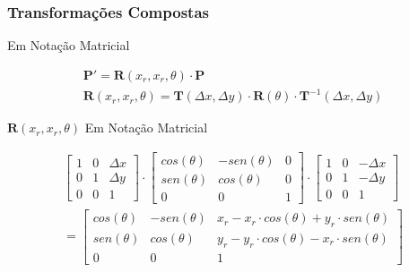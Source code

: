 \documentclass{beamer}
\begin{document}
\begin{frame}
\frametitle{Transformações Compostas}
	
	\begin{block}{Em Notação Matricial }
		
		\begin{eqnarray*}
			\textbf{P}' = \textbf{R}(x_r,x_r,\theta) \cdot \textbf{P} \\
			\textbf{R}(x_r,x_r,\theta) = \textbf{T}(\Delta x,\Delta y) \cdot \textbf{R}(\theta) \cdot \textbf{T}^{-1}( \Delta x,\Delta y)
			\end{eqnarray*}
	\end{block}	
	
	\begin{block}{$\textbf{R}(x_r,x_r,\theta)$ Em Notação Matricial }
		
		\begin{eqnarray*}
			\begin{bmatrix}
					1	& 0 	& \Delta x \\
					0 	& 1	& \Delta y \\
					0	& 0	& 1
			\end{bmatrix}
			\cdot \begin{bmatrix}
					cos(\theta)	& -sen (\theta) 	& 0 \\
					sen(\theta) 	& cos(\theta)		& 0 \\
					0	& 0	& 1
			\end{bmatrix}
			\cdot \begin{bmatrix}
					1	& 0 	& -\Delta x \\
					0 	& 1	& -\Delta y \\
					0	& 0	& 1
			\end{bmatrix}\\
			=  \begin{bmatrix}
					cos(\theta)	& -sen(\theta) & x_r-x_r \cdot cos(\theta)+y_r \cdot sen(\theta) \\
					sen(\theta) & cos(\theta)	& y_r-y_r \cdot cos(\theta)-x_r \cdot sen(\theta) \\
					0	& 0	& 1
			\end{bmatrix}
		\end{eqnarray*}
	\end{block}
\end{frame}
\end{document}
